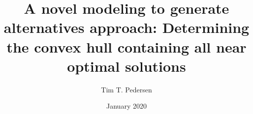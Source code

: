 


\title{\Huge A novel modeling to generate alternatives approach: Determining the convex hull containing all near optimal solutions}
\author{ Tim T. Pedersen}
\date{ January 2020}




	
\frontmatter
{}
\maketitle

\clearpage
{}

\clearpage


\mainmatter
{}\thispagestyle{empty}
\setcounter{chapter}{0}
\renewcommand{\thechapter}{\arabic{chapter}}

\listoffixmes

\clearpage









